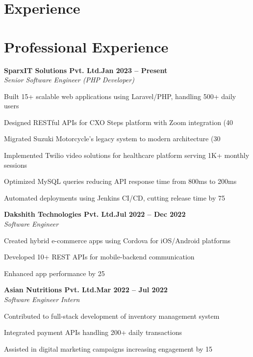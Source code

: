 \documentclass[letterpaper,10pt]{article}
\newcommand{\heading}[2]{
  \hspace{10pt}#1\hfill#2\\
}
\newcommand{\headingBf}[2]{
  \heading{\textbf{#1}}{\textbf{#2}}
}
\newcommand{\headingIt}[2]{
  \heading{\textit{#1}}{\textit{#2}}
}
\newenvironment{resume_list}{
  \vspace{-7pt}
  \begin{itemize}[itemsep=-2px, parsep=1pt, leftmargin=30pt]
}{
  \end{itemize}
}
\begin{document}
\section{Experience}

\section{Professional Experience}

\headingBf{SparxIT Solutions Pvt. Ltd.}{Jan 2023 -- Present}
\headingIt{Senior Software Engineer (PHP Developer)}{}
\begin{resume_list}
    \item Built 15+ scalable web applications using Laravel/PHP, handling 500+ daily users
    \item Designed RESTful APIs for CXO Steps platform with Zoom integration (40%
    \item Migrated Suzuki Motorcycle's legacy system to modern architecture (30%
    \item Implemented Twilio video solutions for healthcare platform serving 1K+ monthly sessions
    \item Optimized MySQL queries reducing API response time from 800ms to 200ms
    \item Automated deployments using Jenkins CI/CD, cutting release time by 75%
\end{resume_list}

\headingBf{Dakshith Technologies Pvt. Ltd.}{Jul 2022 -- Dec 2022}
\headingIt{Software Engineer}{}
\begin{resume_list}
    \item Created hybrid e-commerce apps using Cordova for iOS/Android platforms
    \item Developed 10+ REST APIs for mobile-backend communication
    \item Enhanced app performance by 25%
\end{resume_list}

\headingBf{Asian Nutritions Pvt. Ltd.}{Mar 2022 -- Jul 2022}
\headingIt{Software Engineer Intern}{}
\begin{resume_list}
    \item Contributed to full-stack development of inventory management system
    \item Integrated payment APIs handling 200+ daily transactions
    \item Assisted in digital marketing campaigns increasing engagement by 15%
\end{resume_list}
\end{document}
